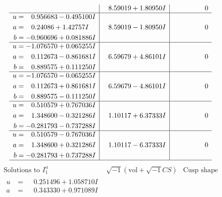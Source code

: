 \documentclass[1p]{elsarticle_modified}
\theoremstyle{definition}
\newcommand{\I}{\sqrt{-1}}
\begin{document}
$$\begin{array}{c|c|c}
 & \phantom{-}8.59019 + 1.80950 I & \phantom{-0.000000 } 0 \\ \hline\begin{aligned}
u &= \phantom{-}0.956683 - 0.495100 I \\
a &= \phantom{-}0.24086 + 1.42757 I \\
b &= -0.960696 + 0.081886 I\end{aligned}
 & \phantom{-}8.59019 - 1.80950 I & \phantom{-0.000000 } 0 \\ \hline\begin{aligned}
u &= -1.076570 + 0.065255 I \\
a &= \phantom{-}0.112673 - 0.861681 I \\
b &= \phantom{-}0.889575 + 0.111250 I\end{aligned}
 & \phantom{-}6.59679 + 4.86101 I & \phantom{-0.000000 } 0 \\ \hline\begin{aligned}
u &= -1.076570 - 0.065255 I \\
a &= \phantom{-}0.112673 + 0.861681 I \\
b &= \phantom{-}0.889575 - 0.111250 I\end{aligned}
 & \phantom{-}6.59679 - 4.86101 I & \phantom{-0.000000 } 0 \\ \hline\begin{aligned}
u &= \phantom{-}0.510579 + 0.767036 I \\
a &= \phantom{-}1.348600 - 0.321286 I \\
b &= -0.281793 - 0.737288 I\end{aligned}
 & \phantom{-}1.10117 + 6.37333 I & \phantom{-0.000000 } 0 \\ \hline\begin{aligned}
u &= \phantom{-}0.510579 - 0.767036 I \\
a &= \phantom{-}1.348600 + 0.321286 I \\
b &= -0.281793 + 0.737288 I\end{aligned}
 & \phantom{-}1.10117 - 6.37333 I & \phantom{-0.000000 } 0\\
 \hline 
 \end{array}$$\newpage$$\begin{array}{c|c|c}  
\text{Solutions to }I^u_{1}& \I (\text{vol} + \sqrt{-1}CS) & \text{Cusp shape}\\
 \hline 
\begin{aligned}
u &= \phantom{-}0.251496 + 1.058710 I \\
a &= \phantom{-}0.343330 + 0.971089 I \\

\end{aligned}
\end{array}$$
\end{document}
